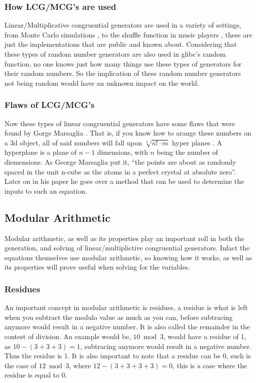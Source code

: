 \documentclass[12pft, english]{article}
\begin{document}
\begin{multicols}{2}
  \subsubsection{How LCG/MCG's are used}
  Linear/Multiplicative congruential generators are used in a variety of settings, from Monte Carlo simulations \citep{fallOntoPlanes}, to the shuffle function in music players \citep{jukSource}, these are just the implementations that are public and known about. Considering that these types of random number generators are also used in glibc's \citep{linuxRNG} random function, no one knows just how many things use these types of generators for their random numbers. So the implication of these random number generators not being random would have an unknown impact on the world.
  \subsubsection{Flaws of LCG/MCG's}
  Now these types of linear congruential generators have some flaws that were found by Gorge Marsaglia \citep{fallOntoPlanes}. That is, if you know how to arange these numbers on a 3d object, all of said numbers will fall upon \(\sqrt[n]{{n}! \cdot m}\) hyper planes \citep{fallOntoPlanes}. A hyperplane is a plane of \(n-1 \) dimensions, with \(n\) being the number of diemensions. As George Marsaglia put it, ``the points are about as randomly spaced in the unit n-cube as the atoms in a perfect crystal at absolute zero''. Later on in his paper he goes over a method that can be used to determine the inputs to such an equation.
  \subsection{Modular Arithmetic}
  Modular arithmetic, as well as its properties play an important roll in both the generation, and solving of linear/multiplictive congruential generators. Infact the equations themselves use modular arithmetic, so knowing how it works, as well as its properties will prove useful when solving for the variables. \citep{modArth}
  \subsubsection{Residues}
  An important concept in modular arithmetic is residues, a residue is what is left when you subtract the modulo value as much as you can, before subtracing anymore would result in a negative number. It is also called the remainder in the contest of division. An example would be, \( 10 \bmod 3\), would have a residue of 1, as \(10 - ( 3 + 3 + 3 ) = 1\), subtracing anymore would result in a negative number. Thus the residue is 1. It is also important to note that a residue can be 0, such is the case of \( 12 \bmod 3\), where \( 12 - ( 3 + 3 + 3 + 3 ) = 0\), this is a case where the residue is equal to 0. \citep{modArth}

\end{multicols}
\end{document}
